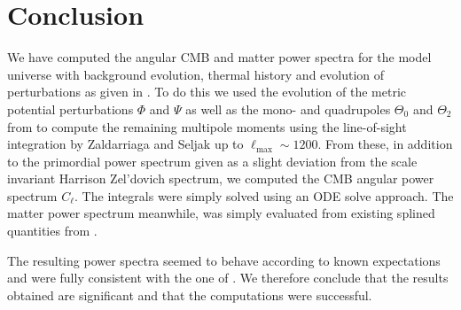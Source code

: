 \documentclass[twocolumn]{aastex62}
\begin{document}
\section{Conclusion} \label{sec:Conclusion}
We have computed the angular CMB and matter power spectra for the model universe with background evolution, thermal history and evolution of perturbations as given in \cite{stutzer:2020a, stutzer:2020b, stutzer:2020c}. To do this we used the evolution of the metric potential perturbations $\Phi$ and $\Psi$ as well as the mono- and quadrupoles $\Theta_0$ and $\Theta_2$ from \cite{stutzer:2020c} to compute the remaining multipole moments using the line-of-sight integration by Zaldarriaga and Seljak up to $\ell_\text{max} \sim 1200$. From these, in addition to the primordial power spectrum given as a slight deviation from the scale invariant Harrison Zel'dovich spectrum, we computed the CMB angular power spectrum $C_\ell$. The integrals were simply solved using an ODE solve approach. The matter power spectrum meanwhile, was simply evaluated from existing splined quantities from \cite{stutzer:2020c}. 

The resulting power spectra seemed to behave according to known expectations and were fully consistent with the one of \cite{callin:2006}. We therefore conclude that the results obtained are significant and that the computations were successful.

\newpage


\end{document}
